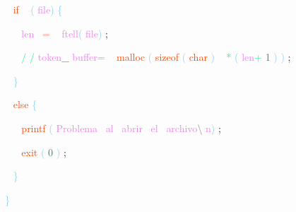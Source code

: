 \documentclass[8, usernames, dvipsnames]{beamer}
\begin{document}
\begin{frame}
\textcolor{White}{\   }
\textcolor{OrangeRed}{if}
\textcolor{White}{\ }
\textcolor{SkyBlue}{(}
\textcolor{Violet}{file}\textcolor{SkyBlue}{)}
\textcolor{SkyBlue}{\{ }

 \textcolor{White}{\   }
\textcolor{White}{\   }
\textcolor{Violet}{len}\textcolor{White}{\ }
\textcolor{Salmon}{=}
\textcolor{White}{\ }
\textcolor{Violet}{ftell}\textcolor{SkyBlue}{(}
\textcolor{Violet}{file}\textcolor{SkyBlue}{)}
\textcolor{Sepia}{;}

 \textcolor{White}{\   }
\textcolor{White}{\   }
\textcolor{SpringGreen}{/}
\textcolor{SpringGreen}{/}
\textcolor{Violet}{token}\textcolor{Sepia}{\_}
\textcolor{Violet}{buffer}\textcolor{Salmon}{=}
\textcolor{White}{\ }
\textcolor{OrangeRed}{malloc}
\textcolor{SkyBlue}{(}
\textcolor{OrangeRed}{sizeof}
\textcolor{SkyBlue}{(}
\textcolor{OrangeRed}{char}
\textcolor{SkyBlue}{)}
\textcolor{White}{\ }
\textcolor{SpringGreen}{*}
\textcolor{SkyBlue}{(}
\textcolor{Violet}{len}\textcolor{SpringGreen}{+}
\textcolor{SeaGreen}{1}
\textcolor{SkyBlue}{)}
\textcolor{SkyBlue}{)}
\textcolor{Sepia}{;}

 \textcolor{White}{\   }
\textcolor{SkyBlue}{\} }

 \textcolor{White}{\   }
\textcolor{OrangeRed}{else}
\textcolor{SkyBlue}{\{ }

 \textcolor{White}{\   }
\textcolor{White}{\   }
\textcolor{OrangeRed}{printf}
\textcolor{SkyBlue}{(}
\textcolor{Violet}{Problema}\textcolor{White}{\ }
\textcolor{Violet}{al}\textcolor{White}{\ }
\textcolor{Violet}{abrir}\textcolor{White}{\ }
\textcolor{Violet}{el}\textcolor{White}{\ }
\textcolor{Violet}{archivo}\textcolor{Gray}{\textbackslash }
\textcolor{Violet}{n}\textcolor{SkyBlue}{)}
\textcolor{Sepia}{;}

 \textcolor{White}{\   }
\textcolor{White}{\   }
\textcolor{OrangeRed}{exit}
\textcolor{SkyBlue}{(}
\textcolor{SeaGreen}{0}
\textcolor{SkyBlue}{)}
\textcolor{Sepia}{;}

 \textcolor{White}{\   }
\textcolor{SkyBlue}{\} }

 
 \textcolor{SkyBlue}{\} }

 \end{frame}
\end{document}

